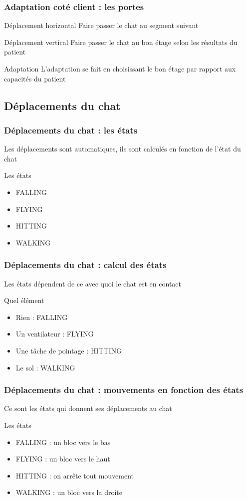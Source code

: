 \documentclass{beamer}
\begin{document}
\begin{frame}
\frametitle{Adaptation coté client : les portes}

\begin{block}{Déplacement horizontal}
Faire passer le chat au segment suivant
\end{block}
\pause	
\begin{block}{Déplacement vertical}
Faire passer le chat au bon étage selon les résultats du patient
\end{block}
\pause
\begin{block}{Adaptation}
L'adaptation se fait en choisissant le bon étage par rapport aux capacités du patient
\end{block}

\end{frame}

\subsection{Déplacements du chat}
\begin{frame}
\frametitle{Déplacements du chat : les états}
Les déplacements sont automatiques, ils sont calculés en fonction de l'état du chat
\pause
\begin{block}{Les états}
\begin{itemize}
\item FALLING
\item FLYING
\item HITTING
\item WALKING
\end{itemize}
\end{block}

\end{frame}

\begin{frame}
\frametitle{Déplacements du chat : calcul des états}
Les états dépendent de ce avec quoi le chat est en contact
\begin{block}{Quel élément}
\begin{itemize}
\item Rien : FALLING
\item Un ventilateur : FLYING
\item Une tâche de pointage : HITTING
\item Le sol : WALKING
\end{itemize}
\end{block}
\end{frame}

\begin{frame}
\frametitle{Déplacements du chat : mouvements en fonction des états}
Ce sont les états qui donnent ses déplacements au chat
\begin{block}{Les états}
\begin{itemize}
\item FALLING : un bloc vers le bas
\item FLYING : un bloc vers le haut
\item HITTING : on arrête tout mouvement
\item WALKING : un bloc vers la droite
\end{itemize}
\end{block}
\end{frame}
\end{document}
